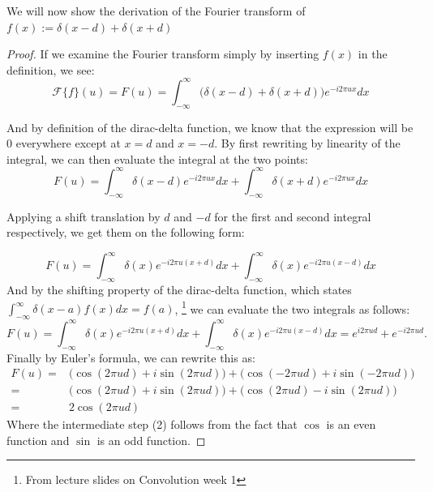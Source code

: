 We will now show the derivation of the Fourier transform of $f(x):=\delta(x-d)+\delta(x+d)$
\begin{proof}
If we examine the Fourier transform simply by inserting $f(x)$ in the definition, we see:
\begin{equation}
	\mathcal{F}\{f\}(u) 
	= F(u)
	= \int_{-\infty}^{\infty} \big(
		\delta(x-d)+\delta(x+d)
	\big)e^{-i 2 \pi u x} dx
\end{equation}

And by definition of the dirac-delta function, we know that the expression
will be 0 everywhere except at $x=d$ and $x=-d$.
By first rewriting by linearity of the integral, we can then evaluate the integral at the two points:
\begin{equation}
	F(u)
	= \int_{-\infty}^{\infty} \delta(x-d)e^{-i 2 \pi u x} dx
	+ \int_{-\infty}^{\infty} \delta(x+d)e^{-i 2 \pi u x} dx
\end{equation}

Applying a shift translation by $d$ and $-d$ for the first and second integral respectively,
we get them on the following form:

\begin{equation}
	F(u)
	= \int_{-\infty}^{\infty} \delta(x)e^{-i 2 \pi u (x+d)} dx
	+ \int_{-\infty}^{\infty} \delta(x)e^{-i 2 \pi u (x-d)} dx
\end{equation}
And by the shifting property of the dirac-delta function,
which states
$\int_{-\infty}^{\infty} \delta(x-a)f(x) dx = f(a)$,
\footnote{
	From lecture slides on Convolution week 1
}
we can evaluate the two integrals as follows:
\begin{equation}
	F(u)
	= \int_{-\infty}^{\infty} \delta(x)e^{-i 2 \pi u (x+d)} dx
	+ \int_{-\infty}^{\infty} \delta(x)e^{-i 2 \pi u (x-d)} dx
	= e^{i 2 \pi u d} + e^{-i 2 \pi  u d}.
\end{equation}
Finally by Euler's formula, we can rewrite this as:
\begin{align}
	F(u) 
	=& \big(
		\cos(2\pi u d) + i \sin(2\pi u d)
	\big) + \big(
		\cos(-2\pi u d) + i \sin(-2\pi u d)
	\big) \\
	=&  \big(
		\cos(2\pi u d) + i \sin(2\pi u d)
	\big) + \big(
		\cos(2\pi u d) - i \sin(2\pi u d)
	\big) \\
	=& 2 \cos(2\pi u d)
\end{align}
Where the intermediate step (2) follows from the fact that $\cos$ is an even function and $\sin$ is an odd function.
\end{proof}
